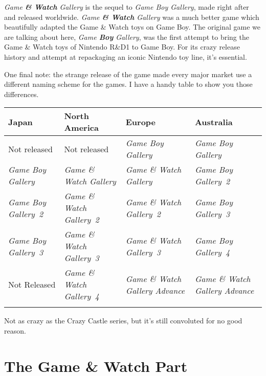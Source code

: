 \documentclass{book}
\let\oldcenter\center
\let\oldendcenter\endcenter
\renewenvironment{center}{\setlength\topsep{0pt}\oldcenter}{\oldendcenter}
\begin{document}
\par\justifying
\emph{Game \textbf{\& Watch} Gallery} is the sequel to \emph{Game Boy Gallery}, made right after and released worldwide. \emph{Game \textbf{\& Watch} Gallery} was a much better game which beautifully adapted the Game \& Watch toys on Game Boy. The original game we are talking about here, \emph{Game \textbf{Boy} Gallery}, was the first attempt to bring the Game \& Watch toys of Nintendo R\&D1 to Game Boy. For its crazy release history and attempt at repackaging an iconic Nintendo toy line, it’s essential.\par
One final note: the strange release of the game made every major market use a different naming scheme for the games. I have a handy table to show you those differences.\par
\begin{center} \footnotesize\begin{tabulary}{\textwidth}{LLLL} \hline
\textbf{Japan} & \textbf{North America} & \textbf{Europe} & \textbf{Australia} \\
\hline
Not released & Not released & \emph{Game Boy Gallery} & \emph{Game Boy Gallery} \\
\hline
\emph{Game Boy Gallery} & \emph{Game \& Watch Gallery} & \emph{Game \& Watch Gallery} & \emph{Game Boy Gallery~2} \\
\hline
\emph{Game Boy Gallery~2} & \emph{Game \& Watch Gallery~2} & \emph{Game \& Watch Gallery~2} & \emph{Game Boy Gallery~3} \\
\hline
\emph{Game Boy Gallery~3} & \emph{Game \& Watch Gallery~3} & \emph{Game \& Watch Gallery~3} & \emph{Game Boy Gallery~4} \\
\hline
Not Released & \emph{Game \& Watch Gallery~4} & \emph{Game \& Watch Gallery Advance} & \emph{Game \& Watch Gallery Advance} \\
\hline \normalsize\end{tabulary} \end{center}
Not as crazy as the Crazy Castle series, but it’s still convoluted for no good reason.\par
\FloatBarrier\section*{The Game \& Watch Part}
\end{document}
